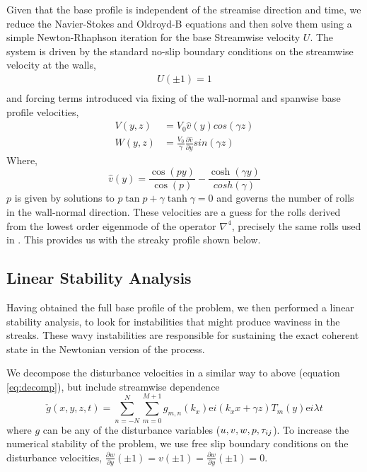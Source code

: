 \documentclass{jfm}
\newcommand{\dy}[1]{\frac{\partial #1}{\partial y}}
\newcommand{\me}{\mathrm{e}}
\begin{document}
Given that the base profile is independent of the streamise direction and time, we reduce the Navier-Stokes and Oldroyd-B equations and then solve them using a simple Newton-Rhaphson iteration for the base Streamwise velocity $U$. The system is driven by the standard no-slip boundary conditions on the streamwise velocity at the walls,
\begin{align}
    U(\pm 1) = 1 \\
\end{align}
and forcing terms introduced via fixing of the wall-normal and spanwise base profile velocities,
\begin{align}
    V(y,z) &= V_0 \hat{v}(y) cos(\gamma z) \\
    W(y,z) &= \frac{V_0}{\gamma} \dy{\hat{v}} sin(\gamma z) 
\end{align}
Where,
\begin{equation}
    \hat{v}(y) = \frac{\cos(py)}{\cos(p)} - \frac{\cosh(\gamma y)}{cosh(\gamma)} 
\end {equation}
$p$ is given by solutions to $p\tan p + \gamma \tanh \gamma = 0$ and governs the number of rolls in the wall-normal direction. These velocities are a guess for the rolls derived from the lowest order eigenmode of the operator $\nabla^{4}$, precisely the same rolls used in \cite{Waleffe97}. This provides us with the streaky profile shown below.

\subsection{Linear Stability Analysis}

Having obtained the full base profile of the problem, we then performed a linear stability analysis, to look for instabilities that might produce waviness in the streaks. These wavy instabilities are responsible for sustaining the exact coherent state in the Newtonian version of the process.

We decompose the disturbance velocities in a similar way to above (equation \ref{eq:decomp}), but include streamwise dependence
\begin{equation}
    \check{g}(x,y,z,t) = \sum_{n=-N}^{N} \sum_{m=0}^{M+1} g_{m,n}(k_{x}) \me{i(k_{x} x + \gamma z)} T_{m}(y) \me{i\lambda t}\label{eq:decomp_disturbances}
\end{equation}
where $g$ can be any of the disturbance variables ($u,v,w,p,\boldmath{\tau}_{ij}$). To increase the numerical stability of the problem, we use free slip boundary conditions on the disturbance velocities, $\dy{w}(\pm1) = v(\pm 1) = \dy{w}(\pm1) = 0$.
\end{document}

